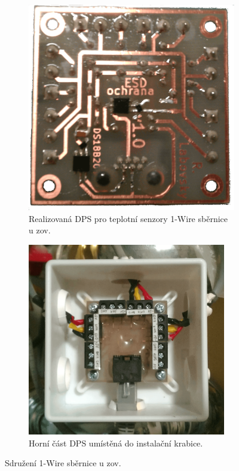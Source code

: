 \begin{figure}[H]
\centering
\begin{subfigure}{.5\textwidth}
    \centering
    \includegraphics[width=\textwidth]{images/zasobnik-otopne-vody/dps-1-wire-sbernice-u-zasobniku-otopne-vody.png}
    \caption{Realizovaná DPS pro teplotní senzory 1-Wire sběrnice u \acrshort{zov}.}
    \label{fig:dps-1-wire-sbernice-u-zasobniku-otopne-vody}
\end{subfigure}%
\begin{subfigure}{.5\textwidth}
   	\centering
    \includegraphics[width=0.95\textwidth]{images/zasobnik-otopne-vody/instalacni-krabice-cidla-u-zasobniku-otopne-vody.png}
    \caption{Horní část DPS umístěná do instalační krabice.}
    \label{fig:instalacni-krabice-cidla-u-zasobniku-otopne-vody}
\end{subfigure}%
\caption{Sdružení 1-Wire sběrnice u \acrshort{zov}.}
\end{figure}

